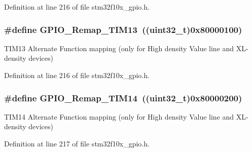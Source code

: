 Definition at line 216 of file stm32f10x\+\_\+gpio.\+h.

\subsubsection[{\texorpdfstring{G\+P\+I\+O\+\_\+\+Remap\+\_\+\+T\+I\+M13}{GPIO_Remap_TIM13}}]{\setlength{\rightskip}{0pt plus 5cm}\#define G\+P\+I\+O\+\_\+\+Remap\+\_\+\+T\+I\+M13~(({\bf uint32\+\_\+t})0x80000100)}\hypertarget{group___g_p_i_o___remap__define_ga72f5da86ed94f3be978cd841f7cd37cb}{}\label{group___g_p_i_o___remap__define_ga72f5da86ed94f3be978cd841f7cd37cb}
T\+I\+M13 Alternate Function mapping (only for High density Value line and X\+L-\/density devices) 

Definition at line 216 of file stm32f10x\+\_\+gpio.\+h.

\subsubsection[{\texorpdfstring{G\+P\+I\+O\+\_\+\+Remap\+\_\+\+T\+I\+M14}{GPIO_Remap_TIM14}}]{\setlength{\rightskip}{0pt plus 5cm}\#define G\+P\+I\+O\+\_\+\+Remap\+\_\+\+T\+I\+M14~(({\bf uint32\+\_\+t})0x80000200)}\hypertarget{group___g_p_i_o___remap__define_gaa2ae554ed69ad3368c2cd7db678b3fd0}{}\label{group___g_p_i_o___remap__define_gaa2ae554ed69ad3368c2cd7db678b3fd0}
T\+I\+M14 Alternate Function mapping (only for High density Value line and X\+L-\/density devices) 

Definition at line 217 of file stm32f10x\+\_\+gpio.\+h.

